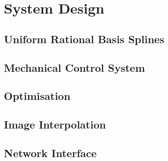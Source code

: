 \chapter{System Design}


\section{Uniform Rational Basis Splines}
\label{sec:design-urbs}
	
	
	

\section{Mechanical Control System}
\label{sec:design-control}
	

\section{Optimisation}
\label{sec:design-optimisation}
	
	
	
	
	


\section{Image Interpolation}
\label{sec:design-interpolation}
		

\section{Network Interface}
\label{sec:network}
